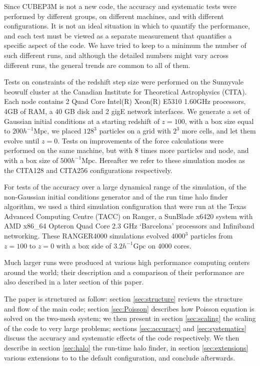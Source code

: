 Since {\small CUBEP3M} is not a new code, the accuracy and systematic tests were performed by different groups, on different machines,
and with different configurations. It is not an ideal situation in which to quantify the performance, and each test must be viewed as a
separate measurement that quantifies a specific aspect of the code. 
We have tried to keep to a minimum the number of such different runs, and although the detailed numbers might vary across different runs, 
the general trends are common to all of them.

Tests on constraints of the redshift step size were performed 
on the Sunnyvale beowulf cluster at the Canadian Institute for Theoretical Astrophysics (CITA).
Each node contains 2 Quad Core Intel(R) Xeon(R) E5310 1.60GHz processors, 4GB of RAM,  a 40 GB disk and 2 gigE network interfaces. 
We generate a set of Gaussian initial conditions at a starting redshift of $z = 100$, 
with a box size equal to $200 h^{-1}\mbox{Mpc}$, we placed
$128^{3}$  particles on a grid with $2^{3}$ more cells, and let them evolve until $z=0$.
Tests on improvements of the force calculations were performed on the same machine, but with 8 times more particles and node, 
and with a box size of $500 h^{-1}\mbox{Mpc}$.
Hereafter we refer to these simulation modes as the CITA128 and CITA256 configurations respectively.

For tests of the accuracy over a large dynamical range of the simulation, of the non-Gaussian initial conditions generator and of the run time halo finder algorithm, 
we used a third simulation configuration that were run at the Texas Advanced Computing Centre (TACC) on Ranger, a SunBlade 
x6420 system with AMD x86\_64 Opteron Quad Core 2.3 GHz `Barcelona' processors and Infiniband networking.
These RANGER4000 simulations evolved $4000^{3}$ particles 
from $z=100$ to $z=0$ with a box side of $3.2 h^{-1}\mbox{Gpc}$
on 4000 cores.
 
 Much larger runs were produced at various high performance computing centers
 around the world; their description and a comparison of their performance are also described in a later section of this paper. 
 

The paper is structured as follow: section \ref{sec:structure} reviews the structure and flow of the main code;
section \ref{sec:Poisson} describes how Poisson equation is solved on the two-mesh system;
we then present in section \ref{sec:scaling} the scaling of the code to very large problems;
sections \ref{sec:accuracy} and \ref{sec:systematics} discuss the accuracy and systematic effects of the code respectively.
 We then describe in section \ref{sec:halo} the run-time halo finder, in section \ref{sec:extensions} various extensions to 
 to the default configuration, and conclude afterwards.




